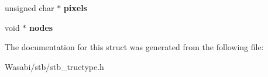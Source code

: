 \begin{DoxyCompactItemize}
\item 
unsigned char $\ast$ {\bfseries pixels}\hypertarget{structstbtt__pack__context_a6549105fd1922df983fbe036b9db4a1a}{}\label{structstbtt__pack__context_a6549105fd1922df983fbe036b9db4a1a}

\item 
void $\ast$ {\bfseries nodes}\hypertarget{structstbtt__pack__context_a11a73fa6860e6be1ac039fcca9db2c7c}{}\label{structstbtt__pack__context_a11a73fa6860e6be1ac039fcca9db2c7c}

\end{DoxyCompactItemize}


The documentation for this struct was generated from the following file\+:\begin{DoxyCompactItemize}
\item 
Wasabi/stb/stb\+\_\+truetype.\+h\end{DoxyCompactItemize}
